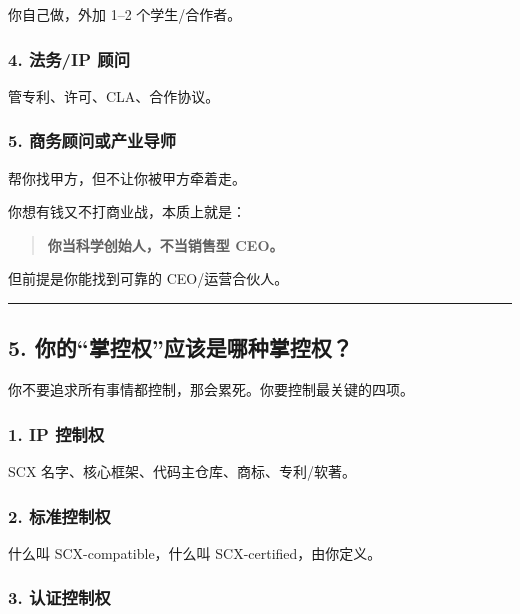 \documentclass[
  12pt,
]{ctexart}
\begin{document}
你自己做，外加 1--2 个学生/合作者。

\subsubsection{4. 法务/IP 顾问}\label{ux6cd5ux52a1ip-ux987eux95ee}

管专利、许可、CLA、合作协议。

\subsubsection{5.
商务顾问或产业导师}\label{ux5546ux52a1ux987eux95eeux6216ux4ea7ux4e1aux5bfcux5e08}

帮你找甲方，但不让你被甲方牵着走。

你想有钱又不打商业战，本质上就是：

\begin{quote}
\textbf{你当科学创始人，不当销售型 CEO。}
\end{quote}

但前提是你能找到可靠的 CEO/运营合伙人。

\begin{center}\rule{0.5\linewidth}{0.5pt}\end{center}

\subsection{5.
你的``掌控权''应该是哪种掌控权？}\label{ux4f60ux7684ux638cux63a7ux6743ux5e94ux8be5ux662fux54eaux79cdux638cux63a7ux6743}

你不要追求所有事情都控制，那会累死。你要控制最关键的四项。

\subsubsection{1. IP 控制权}\label{ip-ux63a7ux5236ux6743}

SCX 名字、核心框架、代码主仓库、商标、专利/软著。

\subsubsection{2. 标准控制权}\label{ux6807ux51c6ux63a7ux5236ux6743}

什么叫 SCX-compatible，什么叫 SCX-certified，由你定义。

\subsubsection{3. 认证控制权}\label{ux8ba4ux8bc1ux63a7ux5236ux6743}
\end{document}

